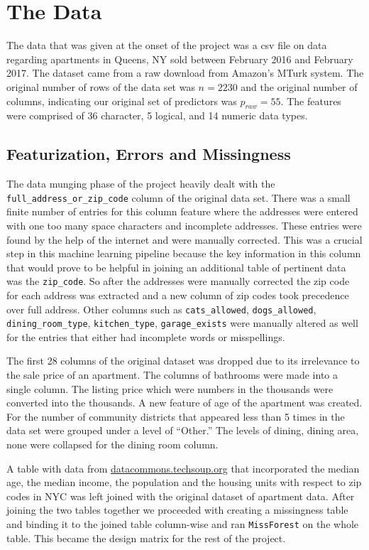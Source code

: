 \documentclass[12pt]{article}
\begin{document}
\section{The Data}

The data that was given at the onset of the project was a csv file on data regarding apartments in Queens, NY sold between February 2016 and February 2017. The dataset came from a raw download from Amazon's MTurk system. The original number of rows of the data set was $n = 2230$ and the original number of columns, indicating our original set of predictors was $p_{raw} = 55$. The features were comprised of 36 character, 5 logical, and 14 numeric data types. 

\subsection{Featurization, Errors and Missingness}

The data munging phase of the project heavily dealt with the \texttt{full\_address\_or\_zip\_code} column of the original data set. There was a small finite number of entries for this column feature where the addresses were entered with one too many space characters and incomplete addresses. These entries were found by the help of the internet and were manually corrected. This was a crucial step in this machine learning pipeline because the key information in this column that would prove to be helpful in joining an additional table of pertinent data was the \texttt{zip\_code}. So after the addresses were manually corrected the zip code for each address was extracted and a new column of zip codes took precedence over full address. Other columns such as \texttt{cats\_allowed}, \texttt{dogs\_allowed}, \texttt{dining\_room\_type}, \texttt{kitchen\_type}, \texttt{garage\_exists} were manually altered as well for the entries that either had incomplete words or misspellings. 

The first 28 columns of the original dataset was dropped due to its irrelevance to the sale price of an apartment. The columns of bathrooms were made into a single column. The listing price which were numbers in the thousands were converted into the thousands. A new feature of age of the apartment was created. For the number of community districts that appeared less than 5 times in the data set were grouped under a level of ``Other.'' The levels of dining, dining area, none were collapsed for the dining room column. 

A table with data from \url{datacommons.techsoup.org} that incorporated the median age, the median income, the population and the housing units with respect to zip codes in NYC  was left joined with the original dataset of apartment data. After joining the two tables together we proceeded with creating a missingness table and binding it to the joined table column-wise and ran \texttt{MissForest} on the whole table. This became the design matrix for the rest of the project.  
\end{document}
